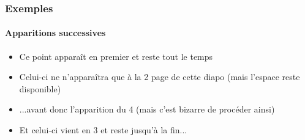\begin{frame}
\frametitle{Exemples}
\framesubtitle{Apparitions successives}

\begin{itemize}
	\item	<1->	Ce point apparaît en premier et reste tout le temps
	\item	<2>	    Celui-ci ne n'apparaîtra que à la 2\ieme{} page de cette diapo (mais l'espace reste disponible)
	\item	<4->	...avant donc l'apparition du 4\ieme{} (mais c'est bizarre de procéder ainsi)
	\item	<3->	Et celui-ci vient en 3\ieme{} et reste jusqu'à la fin...
\end{itemize}

\end{frame}
